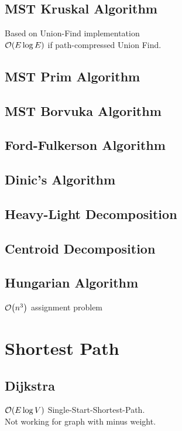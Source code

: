 \documentclass[landscape,8pt]{article}
\begin{document}
\begin{multicols}{2}
  \subsection{MST Kruskal Algorithm}
  Based on Union-Find implementation\\
  $\order{E \log E}$ if path-compressed Union Find.
    

  \subsection{MST Prim Algorithm}
    

  \subsection{MST Borvuka Algorithm}

  \subsection{Ford-Fulkerson Algorithm}

  \subsection{Dinic's Algorithm}

  \subsection{Heavy-Light Decomposition}

  \subsection{Centroid Decomposition}

  \subsection{Hungarian Algorithm}
    $\order{n^3}$ assignment problem
\columnbreak

\section{Shortest Path}
  \subsection{Dijkstra}
    $\order{E \log V}$ Single-Start-Shortest-Path.\\
    Not working for graph with minus weight.
      


\end{multicols}
\end{document}
